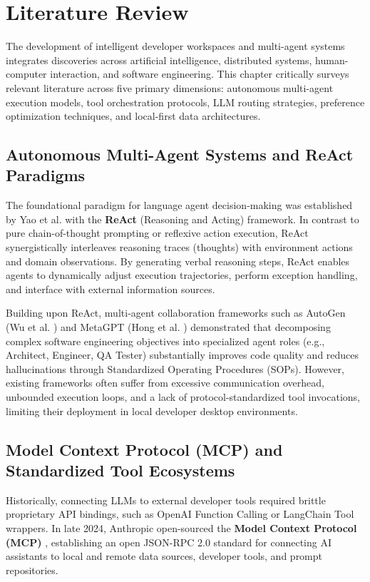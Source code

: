 \documentclass[12pt,a4paper]{report}
\begin{document}
\chapter{Literature Review}

The development of intelligent developer workspaces and multi-agent systems integrates discoveries across artificial intelligence, distributed systems, human-computer interaction, and software engineering. This chapter critically surveys relevant literature across five primary dimensions: autonomous multi-agent execution models, tool orchestration protocols, LLM routing strategies, preference optimization techniques, and local-first data architectures.

\section{Autonomous Multi-Agent Systems and ReAct Paradigms}
The foundational paradigm for language agent decision-making was established by Yao et al. \cite{ref_react} with the \textbf{ReAct} (Reasoning and Acting) framework. In contrast to pure chain-of-thought prompting or reflexive action execution, ReAct synergistically interleaves reasoning traces (thoughts) with environment actions and domain observations. By generating verbal reasoning steps, ReAct enables agents to dynamically adjust execution trajectories, perform exception handling, and interface with external information sources.

Building upon ReAct, multi-agent collaboration frameworks such as AutoGen (Wu et al. \cite{ref_autogen}) and MetaGPT (Hong et al. \cite{ref_metagpt}) demonstrated that decomposing complex software engineering objectives into specialized agent roles (e.g., Architect, Engineer, QA Tester) substantially improves code quality and reduces hallucinations through Standardized Operating Procedures (SOPs). However, existing frameworks often suffer from excessive communication overhead, unbounded execution loops, and a lack of protocol-standardized tool invocations, limiting their deployment in local developer desktop environments.

\section{Model Context Protocol (MCP) and Standardized Tool Ecosystems}
Historically, connecting LLMs to external developer tools required brittle proprietary API bindings, such as OpenAI Function Calling or LangChain Tool wrappers. In late 2024, Anthropic open-sourced the \textbf{Model Context Protocol (MCP)} \cite{ref_mcp_spec}, establishing an open JSON-RPC 2.0 standard for connecting AI assistants to local and remote data sources, developer tools, and prompt repositories.
\end{document}
